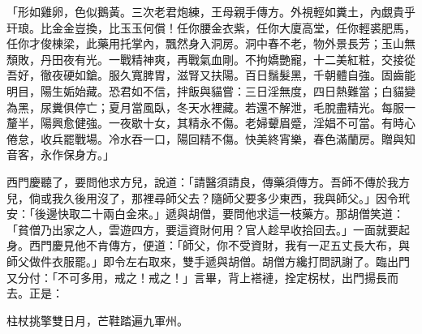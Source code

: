 \begin{myquote}
「形如雞卵，色似鵝黃。三次老君炮練，王母親手傳方。外視輕如糞土，內覷貴乎玕琅。比金金豈換，比玉玉何償！任你腰金衣紫，任你大廈高堂，任你輕裘肥馬，任你才俊棟梁，此藥用托掌內，飄然身入洞房。洞中春不老，物外景長芳；玉山無頹敗，丹田夜有光。一戰精神爽，再戰氣血剛。不拘嬌艷寵，十二美紅粧，交接從吾好，徹夜硬如鎗。服久寬脾胃，滋腎又扶陽。百日鬚髮黑，千朝體自強。固齒能明目，陽生姤始藏。恐君如不信，拌飯與貓嘗：三日淫無度，四日熱難當；白貓變為黑，尿糞俱停亡；夏月當風臥，冬天水裡藏。若還不解泄，毛脫盡精光。每服一釐半，陽興愈健強。一夜歇十女，其精永不傷。老婦顰眉蹙，淫娼不可當。有時心倦怠，收兵罷戰場。冷水吞一口，陽回精不傷。快美終宵樂，春色滿蘭房。贈與知音客，永作保身方。」
\end{myquote} 

西門慶聽了，要問他求方兒，說道：「請醫須請良，傳藥須傳方。吾師不傳於我方兒，倘或我久後用沒了，那裡尋師父去？隨師父要多少東西，我與師父。」因令玳安：「後邊快取二十兩白金來。」遞與胡僧，要問他求這一枝藥方。那胡僧笑道：「貧僧乃出家之人，雲遊四方，要這資財何用？{}官人趁早收拾回去。」一面就要起身。西門慶見他不肯傳方，便道：「師父，你不受資財，我有一疋五丈長大布，與師父做件衣服罷。」即令左右取來，雙手遞與胡僧。胡僧方纔打問訊謝了。臨出門又分付：「不可多用，戒之！戒之！」言畢，背上褡褳，拴定柺杖，出門揚長而去。正是：

\begin{myquote} 
柱杖挑擎雙日月，芒鞋踏遍九軍州。
\end{myquote} 

